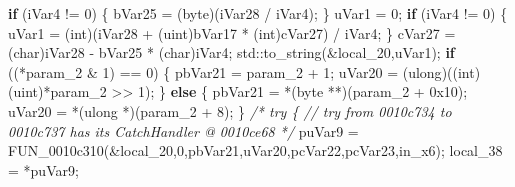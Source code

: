 \documentclass[
]{article}
\newenvironment{Shaded}{}{}
\newcommand{\BaseNTok}[1]{\textcolor[rgb]{0.25,0.63,0.44}{#1}}
\newcommand{\BuiltInTok}[1]{\textcolor[rgb]{0.00,0.50,0.00}{#1}}
\newcommand{\CommentTok}[1]{\textcolor[rgb]{0.38,0.63,0.69}{\textit{#1}}}
\newcommand{\ControlFlowTok}[1]{\textcolor[rgb]{0.00,0.44,0.13}{\textbf{#1}}}
\newcommand{\DataTypeTok}[1]{\textcolor[rgb]{0.56,0.13,0.00}{#1}}
\newcommand{\DecValTok}[1]{\textcolor[rgb]{0.25,0.63,0.44}{#1}}
\newcommand{\ExtensionTok}[1]{#1}
\newcommand{\NormalTok}[1]{#1}
\newcommand{\OperatorTok}[1]{\textcolor[rgb]{0.40,0.40,0.40}{#1}}
\begin{document}
\begin{Shaded}
\begin{Highlighting}[]
  \ControlFlowTok{if} \OperatorTok{(}\NormalTok{iVar4 }\OperatorTok{!=} \DecValTok{0}\OperatorTok{)} \OperatorTok{\{}
\NormalTok{    bVar25 }\OperatorTok{=} \OperatorTok{(}\NormalTok{byte}\OperatorTok{)(}\NormalTok{iVar28 }\OperatorTok{/}\NormalTok{ iVar4}\OperatorTok{);}
  \OperatorTok{\}}
\NormalTok{  uVar1 }\OperatorTok{=} \DecValTok{0}\OperatorTok{;}
  \ControlFlowTok{if} \OperatorTok{(}\NormalTok{iVar4 }\OperatorTok{!=} \DecValTok{0}\OperatorTok{)} \OperatorTok{\{}
\NormalTok{    uVar1 }\OperatorTok{=} \OperatorTok{(}\DataTypeTok{int}\OperatorTok{)(}\NormalTok{iVar28 }\OperatorTok{+} \OperatorTok{(}\ExtensionTok{uint}\OperatorTok{)}\NormalTok{bVar17 }\OperatorTok{*} \OperatorTok{(}\DataTypeTok{int}\OperatorTok{)}\NormalTok{cVar27}\OperatorTok{)} \OperatorTok{/}\NormalTok{ iVar4}\OperatorTok{;}
  \OperatorTok{\}}
\NormalTok{  cVar27 }\OperatorTok{=} \OperatorTok{(}\DataTypeTok{char}\OperatorTok{)}\NormalTok{iVar28 }\OperatorTok{{-}}\NormalTok{ bVar25 }\OperatorTok{*} \OperatorTok{(}\DataTypeTok{char}\OperatorTok{)}\NormalTok{iVar4}\OperatorTok{;}
  \BuiltInTok{std::}\NormalTok{to\_string}\OperatorTok{(\&}\NormalTok{local\_20}\OperatorTok{,}\NormalTok{uVar1}\OperatorTok{);}
  \ControlFlowTok{if} \OperatorTok{((*}\NormalTok{param\_2 }\OperatorTok{\&} \DecValTok{1}\OperatorTok{)} \OperatorTok{==} \DecValTok{0}\OperatorTok{)} \OperatorTok{\{}
\NormalTok{    pbVar21 }\OperatorTok{=}\NormalTok{ param\_2 }\OperatorTok{+} \DecValTok{1}\OperatorTok{;}
\NormalTok{    uVar20 }\OperatorTok{=} \OperatorTok{(}\ExtensionTok{ulong}\OperatorTok{)((}\DataTypeTok{int}\OperatorTok{)(}\ExtensionTok{uint}\OperatorTok{)*}\NormalTok{param\_2 }\OperatorTok{\textgreater{}\textgreater{}} \DecValTok{1}\OperatorTok{);}
  \OperatorTok{\}}
  \ControlFlowTok{else} \OperatorTok{\{}
\NormalTok{    pbVar21 }\OperatorTok{=} \OperatorTok{*(}\NormalTok{byte }\OperatorTok{**)(}\NormalTok{param\_2 }\OperatorTok{+} \BaseNTok{0x10}\OperatorTok{);}
\NormalTok{    uVar20 }\OperatorTok{=} \OperatorTok{*(}\ExtensionTok{ulong} \OperatorTok{*)(}\NormalTok{param\_2 }\OperatorTok{+} \DecValTok{8}\OperatorTok{);}
  \OperatorTok{\}}
                    \CommentTok{/* try \{ // try from 0010c734 to 0010c737 has its CatchHandler @ 0010ce68 */}
\NormalTok{  puVar9 }\OperatorTok{=}\NormalTok{ FUN\_0010c310}\OperatorTok{(\&}\NormalTok{local\_20}\OperatorTok{,}\DecValTok{0}\OperatorTok{,}\NormalTok{pbVar21}\OperatorTok{,}\NormalTok{uVar20}\OperatorTok{,}\NormalTok{pcVar22}\OperatorTok{,}\NormalTok{pcVar23}\OperatorTok{,}\NormalTok{in\_x6}\OperatorTok{);}
\NormalTok{  local\_38 }\OperatorTok{=} \OperatorTok{*}\NormalTok{puVar9}\OperatorTok{;}

\end{Highlighting}
\end{Shaded}
\end{document}
